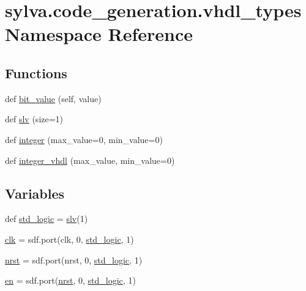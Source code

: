 \hypertarget{namespacesylva_1_1code__generation_1_1vhdl__types}{}\section{sylva.\+code\+\_\+generation.\+vhdl\+\_\+types Namespace Reference}
\label{namespacesylva_1_1code__generation_1_1vhdl__types}
\subsection*{Functions}
\begin{DoxyCompactItemize}
\item 
def \hyperlink{namespacesylva_1_1code__generation_1_1vhdl__types_a44144317f9950d183cd2fff09c4e60c3}{bit\+\_\+value} (self, value)
\item 
def \hyperlink{namespacesylva_1_1code__generation_1_1vhdl__types_a8502d9eb6526007840a5e33d37826a0b}{slv} (size=1)
\item 
def \hyperlink{namespacesylva_1_1code__generation_1_1vhdl__types_a4611eb11c8cdddc4f30c1df0871ac6f0}{integer} (max\+\_\+value=0, min\+\_\+value=0)
\item 
def \hyperlink{namespacesylva_1_1code__generation_1_1vhdl__types_aedfc2fbc8284831ee3ef21debc186c98}{integer\+\_\+vhdl} (max\+\_\+value, min\+\_\+value=0)
\end{DoxyCompactItemize}
\subsection*{Variables}
\begin{DoxyCompactItemize}
\item 
def \hyperlink{namespacesylva_1_1code__generation_1_1vhdl__types_a845f43d0f072fe58cc3fbb8a1028cb2e}{std\+\_\+logic} = \hyperlink{namespacesylva_1_1code__generation_1_1vhdl__types_a8502d9eb6526007840a5e33d37826a0b}{slv}(1)
\item 
\hyperlink{namespacesylva_1_1code__generation_1_1vhdl__types_a46ca649e36cf067a6e5140e7173b3c39}{clk} = sdf.\+port(\textquotesingle{}clk\textquotesingle{}, 0, \hyperlink{namespacesylva_1_1code__generation_1_1vhdl__types_a845f43d0f072fe58cc3fbb8a1028cb2e}{std\+\_\+logic}, 1)
\item 
\hyperlink{namespacesylva_1_1code__generation_1_1vhdl__types_a489fa8436cce610e31ddae7b882063d7}{nrst} = sdf.\+port(\textquotesingle{}nrst\textquotesingle{}, 0, \hyperlink{namespacesylva_1_1code__generation_1_1vhdl__types_a845f43d0f072fe58cc3fbb8a1028cb2e}{std\+\_\+logic}, 1)
\item 
\hyperlink{namespacesylva_1_1code__generation_1_1vhdl__types_a4da139baa6ee6ea4b41421f259b9ff3b}{en} = sdf.\+port(\textquotesingle{}\hyperlink{namespacesylva_1_1code__generation_1_1vhdl__types_a489fa8436cce610e31ddae7b882063d7}{nrst}\textquotesingle{}, 0, \hyperlink{namespacesylva_1_1code__generation_1_1vhdl__types_a845f43d0f072fe58cc3fbb8a1028cb2e}{std\+\_\+logic}, 1)
\end{DoxyCompactItemize}


